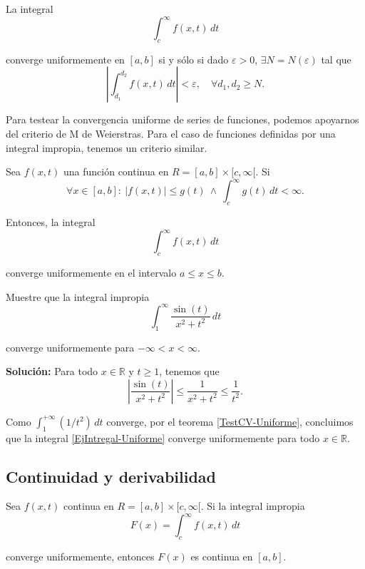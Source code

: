 \begin{teorema} \label{IntegralCauchy}
    La integral 
 $$\int_c^{\infty} f(x,t) \,dt$$

 converge uniformemente en $[a,b]$ si y sólo si dado $\varepsilon > 0$, $\exists N = N(\varepsilon)$ tal que
 $$\left| \int_{d_1}^{d_2} f(x,t) \,dt\right| < \varepsilon, \quad \forall d_1,d_2 \geq N.$$
\end{teorema}

Para testear la convergencia uniforme de series de funciones, podemos apoyarnos del criterio de M de Weierstras. Para el caso de funciones definidas por una integral impropia, tenemos un criterio similar.

\begin{teorema} \label{TestCV-Uniforme}
 Sea $f(x,t)$ una función continua en $R = [a,b] \times [c, \infty[$. Si 
 $$\forall x \in [a,b]: ~ |f(x,t)| \leq g(t) ~\wedge~ \int_c^{\infty} g(t) \,dt < \infty.$$

 Entonces, la integral 
 $$\int_c^{\infty} f(x,t) \,dt$$

 converge uniformemente en el intervalo $a \leq x \leq b$.
\end{teorema}

\begin{ejemplo}
    Muestre que la integral impropia
    \begin{equation}
      \int_1^{\infty} \frac{\sin(t)}{x^2+t^2} \,dt  \label{EjIntregal-Uniforme}
    \end{equation}

    converge uniformemente para $- \infty < x < \infty$.

    \textbf{Solución:} Para todo $x \in \mathbb{R}$ y $t \geq 1$, tenemos que
    $$\left| \frac{\sin(t)}{x^2+t^2} \right| \leq \frac{1}{x^2+t^2} \leq \frac{1}{t^2}.$$

    Como $\int_1^{+\infty} (1/t^2) \,dt$ converge, por el teorema \eqref{TestCV-Uniforme}, concluimos que la integral \eqref{EjIntregal-Uniforme} converge uniformemente para todo $x \in \mathbb{R}$.
\end{ejemplo}

\subsection{Continuidad y derivabilidad}

\begin{teorema} \label{TeoA:Continuidad}
    Sea $f(x,t)$ continua en $R = [a, b] \times [c, \infty[$. Si la integral impropia 
    $$F(x) = \int_c^{\infty} f(x,t) \,dt$$

    converge uniformemente, entonces $F(x)$ es continua en $[a,b]$.
\end{teorema}

